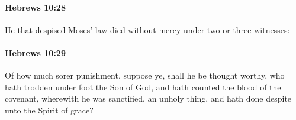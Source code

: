 		\paragraph{Hebrews 10:28} %
			\label{HEBREWS-10-28}

			He that despised Moses' law died without mercy under two or three witnesses:

			\begin{framed}
			\scriptsize
				\begin{compactdesc}
					\item[SBLG] 
				\end{compactdesc}
			\end{framed}

		\paragraph{Hebrews 10:29} %
			\label{HEBREWS-10-29}

			Of how much sorer punishment, suppose ye, shall he be thought worthy, who hath trodden under foot the Son of God, and hath counted the blood of the covenant, wherewith he was sanctified, an unholy thing, and hath done despite unto the Spirit of grace?

